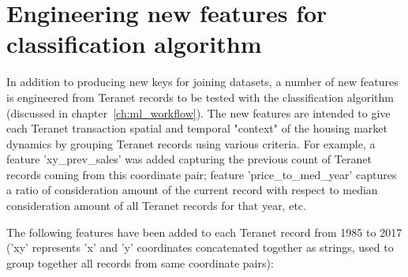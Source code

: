 \section{Engineering new features for classification algorithm} \label{sec:feature_engineering}

In addition to producing new keys for joining datasets, a number of new features is engineered from Teranet records to be tested with the classification algorithm (discussed in chapter~\ref{ch:ml_workflow}).
The new features are intended to give each Teranet transaction spatial and temporal "context" of the housing market dynamics by grouping Teranet records using various criteria.
For example, a feature 'xy\_prev\_sales' was added capturing the previous count of Teranet records coming from this coordinate pair;
feature 'price\_to\_med\_year' captures a ratio of consideration amount of the current record with respect to median consideration amount of all Teranet records for that year, etc.

The following features have been added to each Teranet record from 1985 to 2017 ('xy' represents 'x' and 'y' coordinates concatenated together as strings, used to group together all records from same coordinate pairs):

